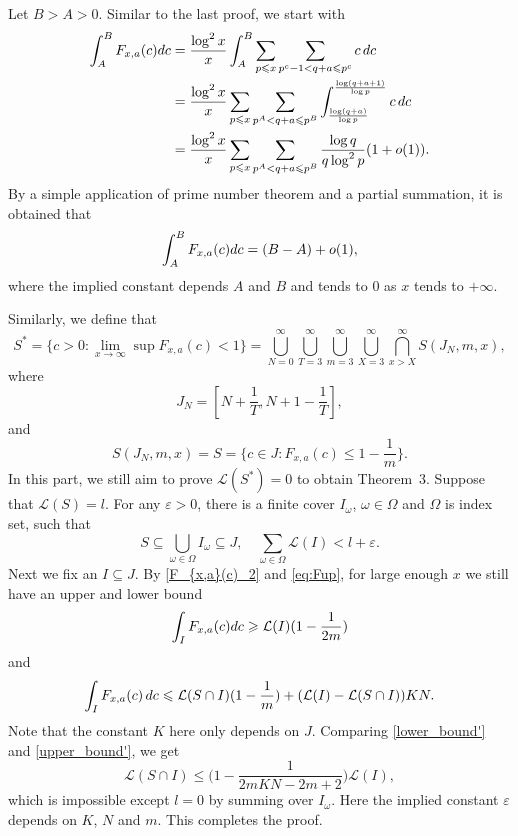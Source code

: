\documentclass[12pt, reqno, twoside, letterpaper]{amsart}
\numberwithin{equation}{section}
\def\eps{\varepsilon}
\newcommand{\cL}{\ensuremath{\mathcal{L}}}
\theoremstyle{customthm}
\theoremstyle{customrem}
\def\int{\intop\nolimits}
\begin{document}
Let $B> A > 0$. Similar to the last proof, we start with
\begin{align*}
\int_{A}^{B}F_{x,a}(c)dc &=\frac{\log^2x}{x}\int_{A}^{B}\sum_{p\leqslant x}\sum_{p^c-1<q+a\leqslant p^c}c \, dc  \nonumber \\
&=\frac{\log ^2x}{x}\sum_{p\leqslant x}\sum_{p^A<q+a\leqslant p^B}\int_{\frac{\log (q+a)}{\log p}}^{\frac{\log (q+a+1)}{\log p}}c \, dc \\
&=\frac{\log^2x}{x}\sum_{p\leqslant x}\sum_{p^A<q+a\leqslant p^B}\frac{\log q}{q\log ^2p}(1+o(1)).
\end{align*}
By a simple application of prime number theorem and a partial summation, it is obtained that
\begin{equation}
	\label{F_{x,a}(c)_2}
\int_{A}^{B}F_{x,a}(c)dc=(B-A)+o(1),
\end{equation}
where the implied constant depends $A$ and $B$ and tends to $0$ as $x$ tends to $+\infty$.

Similarly, we define that
\begin{equation*}
	S^*=\{ c>0: \lim\limits_{x\rightarrow\infty }\sup F_{x,a}(c)<1 \}=\bigcup_{N=0}^{\infty}\bigcup_{T=3}^{\infty}\bigcup_{m=3}^{\infty}\bigcup_{X=3}^{\infty}\bigcap_{x>X}^{\infty}S(J_N,m,x),
\end{equation*}
where
$$
J_N=[N+\frac{1}{T},N+1-\frac{1}{T}],
$$
and
$$
S(J_N,m,x)=S=\{ c\in J: F_{x,a}(c)\leqslant 1-\frac{1}{m} \}.
$$
In this part, we still aim to prove $\cL(S^*)=0$ to obtain Theorem~3. Suppose that $\cL(S)=l$. For any $\eps>0$, there is a finite cover $I_{\omega}$, $\omega\in\Omega$ and $\Omega$ is index set, such that
$$
S\subseteq \bigcup_{\omega\in\Omega}I_{\omega}\subseteq J,\quad \sum_{\omega\in\Omega} \cL(I)<l+\eps.
$$
Next we fix an $I\subseteq J$. By \eqref{F_{x,a}(c)_2} and \eqref{eq:Fup}, for large enough $x$ we still have an upper and lower bound 
\begin{equation}
	\label{lower_bound'}
	\int_{I}F_{x,a}(c)dc\geqslant \cL(I)(1-\frac{1}{2m})
\end{equation}
and
\begin{equation}
	\label{upper_bound'}
	\int_{I}F_{x,a}(c)\,dc\leqslant \cL(S\cap I)(1-\frac{1}{m})+( \cL(I) - \cL(S\cap I))KN.
\end{equation}
Note that the constant $K$ here only depends on $J$. Comparing \eqref{lower_bound'} and \eqref{upper_bound'}, we get
$$
\cL(S\cap I)\leqslant \big( 1-\frac{1}{2mKN-2m+2} \big) \cL(I),
$$
which is impossible except $l=0$ by summing over $I_{\omega}$. Here the implied constant $\varepsilon$ depends on $K$, $N$ and $m$. This completes the proof.
\end{document}
